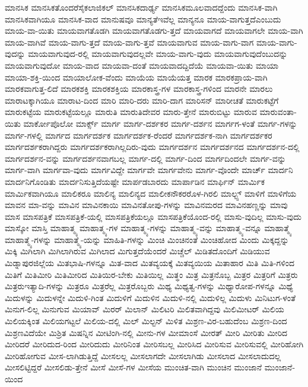 {ಮಾನಸಿಕ
ಮಾನಸಿಕತೊಂದರೆಸೈಕಲಾಜಿಕಲ್
ಮಾನಸಿಕದಾರ್ಢ್ಯ
ಮಾನಸಿಕಮೂಲವಾದದ್ದೆಂದು
ಮಾನಸಿಕ-ವಾಗಿ
ಮಾನಸಿಕವಾಗಿಯೂ
ಮಾನಸಿಕ-ವಾದ
ಮಾನುಷವೂ
ಮಾನ್ಯತೆಇವೆಲ್ಲ
ಮಾನ್ಯನೂ
ಮಾಯ-ವಾಗುತ್ತದೆಎಂಬುದು
ಮಾಯ-ವಾ-ಯಿತು
ಮಾಯವಾಗತೊಡಗಿ
ಮಾಯವಾಗತೊಡಗು-ತ್ತದೆ
ಮಾಯವಾಗದೆ
ಮಾಯವಾಗಲೇ
ಮಾಯ-ವಾಗಿ
ಮಾಯ-ವಾಗಿವೆ
ಮಾಯ-ವಾಗು-ತ್ತದೆ
ಮಾಯ-ವಾಗು-ತ್ತವೆ
ಮಾಯವಾಗುವ
ಮಾಯ-ವಾಗು-ವಾಗ
ಮಾಯ-ವಾಗು-ವುದನ್ನು
ಮಾಯವಾಗುವುದ-ರಲ್ಲಿ
ಮಾಯವಾಗುವುದಲ್ಲವೇ
ಮಾಯ-ವಾಗು-ವುದು
ಮಾಯವಾಗುವುದೆಂಬುದನ್ನು
ಮಾಯವಾಗುವುದೋ
ಮಾಯ-ವಾದ
ಮಾಯವಾ-ದಂತೆ
ಮಾಯವಾದದ್ದಿದೆಯೆ
ಮಾಯವಾ-ಯಿತು
ಮಾಯಾ
ಮಾಯಾ-ಶಕ್ತಿ-ಯಿಂದ
ಮಾಯಾಲೋಕ-ವೆಂದು
ಮಾಯೆಯ
ಮಾಯೆಯತ್ತ
ಮಾರಕ
ಮಾರಕಪ್ರಾಯ-ವಾಗಿ
ಮಾರಕವಾಗುತ್ತ-ಲಿದೆ
ಮಾರಕಶಕ್ತಿ
ಮಾರಕಶಕ್ತಿಯ
ಮಾರಕಾಸ್ತ್ರ-ಗಳ
ಮಾರಕಾಸ್ತ್ರ-ಗಳಿಂದ
ಮಾರನೇ
ಮಾರಲು
ಮಾರಾಟಕ್ಕಾಗಿಯೂ
ಮಾರಾಟ-ದಿಂದ
ಮಾರಿ
ಮಾರಿ-ದರು
ಮಾರಿ-ದಾಗ
ಮಾರಿಸನ್
ಮಾರೀಚತೆ
ಮಾರುಕಟ್ಟೆಗೆ
ಮಾರುಕಟ್ಟೆಯ
ಮಾರುಕಟ್ಟೆಯಲ್ಲೂ
ಮಾರುತಿ
ಮಾರುತಿದೇವರ
ಮಾರು-ತ್ತೇನೆ
ಮಾರುಬಿಟ್ಟು
ಮಾರುವ
ಮಾರುವಂತಾ-ಯಿತು
ಮಾರ್ಕೋಪೊಲೋ
ಮಾರ್ಕ್ಸ್
ಮಾರ್ಗ
ಮಾರ್ಗ-ದರ್ಶಕರ
ಮಾರ್ಗ-ದರ್ಶನ
ಮಾರ್ಗಗ-ಳಂತೆ
ಮಾರ್ಗ-ಗಳನ್ನು
ಮಾರ್ಗ-ಗಳಲ್ಲಿ
ಮಾರ್ಗದ
ಮಾರ್ಗದರ್ಶಕ
ಮಾರ್ಗದರ್ಶಕ-ರೆಂದರೆ
ಮಾರ್ಗದರ್ಶಕ-ನಾಗಿ
ಮಾರ್ಗದರ್ಶಕರ
ಮಾರ್ಗದರ್ಶಕರಾಗಿದ್ದರು
ಮಾರ್ಗದರ್ಶಕರಾಗಿಲ್ಲದಿರು-ವುದು
ಮಾರ್ಗದರ್ಶನ
ಮಾರ್ಗದರ್ಶನದ
ಮಾರ್ಗದರ್ಶನ-ದಲ್ಲಿ
ಮಾರ್ಗದರ್ಶನ-ವನ್ನು
ಮಾರ್ಗದರ್ಶನವಾಗಬಲ್ಲ
ಮಾರ್ಗ-ದಲ್ಲಿ
ಮಾರ್ಗ-ದಿಂದ
ಮಾರ್ಗದಿಂದಲೇ
ಮಾರ್ಗ-ವನ್ನು
ಮಾರ್ಗ-ವಾಗಿ
ಮಾರ್ಗವಾ-ವುದು
ಮಾರ್ಗವಿದ್ದೇ
ಮಾರ್ಗವೇ
ಮಾರ್ಗವೇನು
ಮಾರ್ಗ-ವೊಂದೇ
ಮಾರ್ಚ್
ಮಾರ್ದನಿ
ಮಾರ್ದನಿಗೊಂಡಿತು
ಮಾರ್ದನಿಸುತ್ತಿದೆಯಷ್ಟೇ
ಮಾರ್ಪಡಬಾರದು
ಮಾರ್ಪಾಡಿನ
ಮಾರ್ಫಿನ್
ಮಾರ್ಮಿಕ
ಮಾರ್ಮಿಕವಾಗಿಯೂ
ಮಾಲಿಕರೂ
ಮಾಲಿನ್ಯ
ಮಾಲಿನ್ಯದ
ಮಾಲೀಕನೌಕರರೊಳ-ಗಿರಲಿ
ಮಾಲ್ಟ್ಸ್
ಮಾಳಿಗೆ
ಮಾಳಿಗೆಯ
ಮಾವನ
ಮಾ-ವನ್ನು
ಮಾವಿನ
ಮಾವಿನಕಾಯಿ
ಮಾವಿನತೋಪು-ಗಳನ್ನು
ಮಾವಿನಮರದ
ಮಾವಿನಹಣ್ಣನ್ನು
ಮಾವು
ಮಾಸ
ಮಾಸಪತ್ರಿಕೆ
ಮಾಸಪತ್ರಿಕೆ-ಯಲ್ಲಿ
ಮಾಸಪತ್ರಿಕೆಯಲ್ಲೂ
ಮಾಸಪತ್ರಿಕೆಯೊಂದ-ರಲ್ಲಿ
ಮಾಸು-ವುದಿಲ್ಲ
ಮಾಸು-ವುದು
ಮಾಸ್ಕೋ
ಮಾಸ್ತಿ
ಮಾಹಾತ್ಮ್ಯ
ಮಾಹಾತ್ಮ್ಯ-ಗಳ
ಮಾಹಾತ್ಮ್ಯ-ಗಳನ್ನು
ಮಾಹಾತ್ಮ್ಯ-ವನ್ನು
ಮಾಹಾತ್ಮ್ಯ-ವನ್ನೂ
ಮಾಹಾತ್ಮ್ಯೆ
ಮಾಹಾತ್ಮ್ಯೆ-ಗಳನ್ನು
ಮಾಹಾತ್ಮ್ಯೆ-ಯನ್ನು
ಮಾಹಿತಿ-ಗಳನ್ನು
ಮಿಂಚಿ
ಮಿಂಚಿನಂತೆ
ಮಿಂಚಿಹೋದ
ಮಿಂದು
ಮಿಕ್ಕದ್ದನ್ನು
ಮಿಕ್ಕಿ
ಮಿಗಿಲಾಗಿ
ಮಿಗಿಲಾಗಿರುವ
ಮಿಗಿಲಾದ
ಮಿಗುತ್ತದೆಯೆಂದರೆ
ಮಿಚ್ಚೆಲ್
ಮಿಡಿತದೊಂದಿಗೆ
ಮಿಡಿಯುವ
ಮಿಡ್ನಾಪುರಜಿಲ್ಲೆಯ
ಮಿತಭಾಷಿ-ಗಳನ್ನೂ
ಮಿತ-ವಾದ
ಮಿತವ್ಯಯಕ್ಕೆ
ಮಿತವ್ಯಯಿಯ
ಮಿತಾಹಾರ
ಮಿತಿ
ಮಿತಿ-ಗಳಿಂದ
ಮಿತಿಗೆ
ಮಿತಿಮೀರಿ
ಮಿತಿಮೀರಿದ
ಮಿತಿಯಿರ-ಬೇಕು
ಮಿತಿಯಿಲ್ಲ
ಮಿತ್ಥಂ
ಮಿತ್ರ
ಮಿತ್ರನೊಬ್ಬ
ಮಿತ್ರರ
ಮಿತ್ರರಿಗೆ
ಮಿತ್ರರು
ಮಿತ್ರರುಇತ್ಯಾದಿ-ಗಳನ್ನು
ಮಿತ್ರರೂ
ಮಿತ್ರರೆಲ್ಲ
ಮಿತ್ರರೊಬ್ಬರು
ಮಿಥ್ಯ
ಮಿಥ್ಯತ್ವ-ಗಳನ್ನು
ಮಿಥ್ಯಾರೋಪ-ಗಳನ್ನೂ
ಮಿಥ್ಯೆ
ಮಿದುಳನ್ನು
ಮಿದುಳನ್ನೇ
ಮಿದುಳಿ-ಗಿಂತ
ಮಿದುಳಿಗೆ
ಮಿದುಳಿನ
ಮಿದುಳಿ-ನಲ್ಲಿ
ಮಿದುಳಿಲ್ಲ
ಮಿದುಳು
ಮಿನಿಟುಗ-ಳಂತೆ
ಮಿನುಗ-ಲಿಲ್ಲ
ಮಿನುಗುವ
ಮಿಯಾವ್
ಮಿರರ್
ಮಿಲಾನ್
ಮಿಲಿಟರಿ
ಮಿಲಿತವಾಗಿದ್ದವು
ಮಿಲಿಮೀಟರ್
ಮಿಲಿಯ
ಮಿಲಿಯಕ್ಕಿಂತ
ಮಿಲಿಯಗಟ್ಟಲೆ
ಮಿಲಿಯ-ದಲ್ಲಿ
ಮಿಲ್
ಮಿಲ್ಟನ್
ಮಿಳಿತ
ಮಿಶ್ರಣ-ವಿರ-ಬಹುದೆಂಬ
ಮಿಶ್ರಣ-ದಿಂದ
ಮಿಶ್ರಣವಿದೆಯೇ
ಮಿಶ್ರಿತ
ಮಿಷನ್ನಿನ
ಮೀಟಿಂಗಿ-ನಲ್ಲಿ
ಮೀನು-ಗಳ
ಮೀಮಾಂಸೆ
ಮೀರತ್
ಮೀರಿ
ಮೀರಿತು
ಮೀರಿದ
ಮೀರಿದರೆ
ಮೀರಿದುದ-ರಿಂದ
ಮೀರಿದುದು
ಮೀರಿನಿಂತ
ಮೀರಿಸಬಲ್ಲ
ಮೀರಿಸಿದ
ಮೀರಿಸುವ
ಮೀರಿಸುವಲ್ಲಿ
ಮೀರಿಹೋಗಿ
ಮೀರಿಹೋಗುವ
ಮೀಸ-ಲಾಗಿಡುತ್ತಿದ್ದೆ
ಮೀಸಲಲ್ಲ
ಮೀಸಲಾಗದೇ
ಮೀಸಲಾಗಿಡು
ಮೀಸಲಾದ
ಮೀಸಲಾದುದಲ್ಲ
ಮೀಸಲಿಟ್ಟಿದ್ದರೆ
ಮೀಸಲಿಡು-ತ್ತೇನೆ
ಮೀಸೆ
ಮೀಸೆ-ಗಳ
ಮೀಸೆಯ
ಮುಂಚಿತ-ವಾಗಿ
ಮುಂಚಿನ
ಮುಂಜಾನೆ
ಮುಂಜಾನೆ-ಯಿಂದ
}
